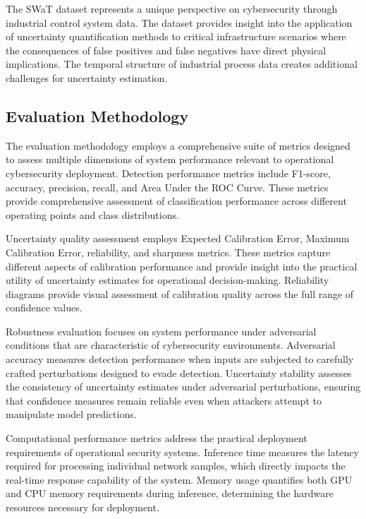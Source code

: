 \documentclass[journal]{IEEEtran}
\begin{document}
The SWaT dataset represents a unique perspective on cybersecurity through industrial control system data. The dataset provides insight into the application of uncertainty quantification methods to critical infrastructure scenarios where the consequences of false positives and false negatives have direct physical implications. The temporal structure of industrial process data creates additional challenges for uncertainty estimation.

\subsection{Evaluation Methodology}

The evaluation methodology employs a comprehensive suite of metrics designed to assess multiple dimensions of system performance relevant to operational cybersecurity deployment. Detection performance metrics include F1-score, accuracy, precision, recall, and Area Under the ROC Curve. These metrics provide comprehensive assessment of classification performance across different operating points and class distributions.

Uncertainty quality assessment employs Expected Calibration Error, Maximum Calibration Error, reliability, and sharpness metrics. These metrics capture different aspects of calibration performance and provide insight into the practical utility of uncertainty estimates for operational decision-making. Reliability diagrams provide visual assessment of calibration quality across the full range of confidence values.

Robustness evaluation focuses on system performance under adversarial conditions that are characteristic of cybersecurity environments. Adversarial accuracy measures detection performance when inputs are subjected to carefully crafted perturbations designed to evade detection. Uncertainty stability assesses the consistency of uncertainty estimates under adversarial perturbations, ensuring that confidence measures remain reliable even when attackers attempt to manipulate model predictions.

Computational performance metrics address the practical deployment requirements of operational security systems. Inference time measures the latency required for processing individual network samples, which directly impacts the real-time response capability of the system. Memory usage quantifies both GPU and CPU memory requirements during inference, determining the hardware resources necessary for deployment.
\end{document}
